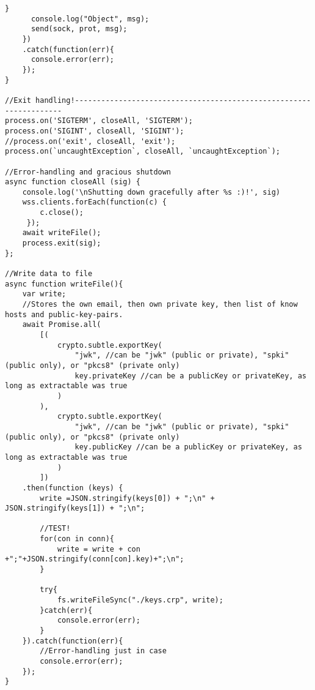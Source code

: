 \begin{lstlisting}[caption=ACS Server, style=htmlcssjs]
	  }
	  console.log("Object", msg);
	  send(sock, prot, msg);
	})
	.catch(function(err){
	  console.error(err);
	});
}

//Exit handling!-------------------------------------------------------------------
process.on('SIGTERM', closeAll, 'SIGTERM');
process.on('SIGINT', closeAll, 'SIGINT');
//process.on('exit', closeAll, 'exit');
process.on(`uncaughtException`, closeAll, `uncaughtException`);

//Error-handling and gracious shutdown
async function closeAll (sig) {
	console.log('\nShutting down gracefully after %s :)!', sig)
	wss.clients.forEach(function(c) {
		c.close();
	 });
	await writeFile();
	process.exit(sig);
};

//Write data to file
async function writeFile(){
	var write;
	//Stores the own email, then own private key, then list of know hosts and public-key-pairs.
	await Promise.all(
		[(
			crypto.subtle.exportKey(
				"jwk", //can be "jwk" (public or private), "spki" (public only), or "pkcs8" (private only)
				key.privateKey //can be a publicKey or privateKey, as long as extractable was true
			)
		),
			crypto.subtle.exportKey(
				"jwk", //can be "jwk" (public or private), "spki" (public only), or "pkcs8" (private only)
				key.publicKey //can be a publicKey or privateKey, as long as extractable was true
			)
		])
	.then(function (keys) {
		write =JSON.stringify(keys[0]) + ";\n" + JSON.stringify(keys[1]) + ";\n";
		
		//TEST!
		for(con in conn){
			write = write + con +";"+JSON.stringify(conn[con].key)+";\n";
		}
				
		try{
	 		fs.writeFileSync("./keys.crp", write);
		}catch(err){
			console.error(err);
		}
	}).catch(function(err){
		//Error-handling just in case
		console.error(err);
	});
}
\end{lstlisting}
